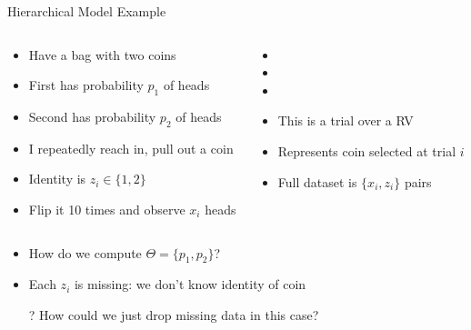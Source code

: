 \documentclass[aspectratio=169]{beamer}
\begin{document}
\begin{frame}{Hierarchical Model Example}

\begin{columns}[T]
\begin{column}{0.5\textwidth}
	\begin{itemize}
		\item Have a bag with two coins 
		\item First has probability $p_1$ of heads
		\item Second has probability $p_2$ of heads
		\item I repeatedly reach in, pull out a coin
		\item Identity is $z_i \in \{1, 2\}$
		\item Flip it 10 times and observe $x_i$ heads
	\end{itemize}
\end{column}
\begin{column}{0.5\textwidth}
	\begin{itemize}
		\item 
		\item 
		\item 
		\item This is a trial over a RV
		\item Represents  coin selected at trial $i$
		\item Full dataset is $\{x_i, z_i\}$ pairs
	\end{itemize}
\end{column}
\end{columns}
\begin{itemize}
\item How do we compute $\Theta = \{p_1, p_2\}$?
\item Each $z_i$ is missing: we don't know identity of coin
\item[?] How could we just drop missing data in this case?  %
\end{itemize}
\end{frame}
\end{document}
